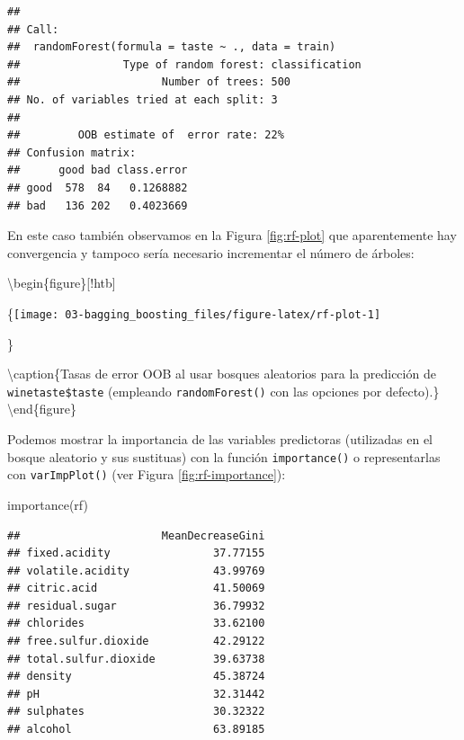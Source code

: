 \documentclass[
  spanish,
]{book}
\newenvironment{Shaded}{\begin{snugshade}}{\end{snugshade}}
\newcommand{\AttributeTok}[1]{\textcolor[rgb]{0.77,0.63,0.00}{#1}}
\newcommand{\DecValTok}[1]{\textcolor[rgb]{0.00,0.00,0.81}{#1}}
\newcommand{\FunctionTok}[1]{\textcolor[rgb]{0.00,0.00,0.00}{#1}}
\newcommand{\NormalTok}[1]{#1}
\newcommand{\SpecialCharTok}[1]{\textcolor[rgb]{0.00,0.00,0.00}{#1}}
\newcommand{\StringTok}[1]{\textcolor[rgb]{0.31,0.60,0.02}{#1}}
\theoremstyle{break}
\theoremstyle{definition}
\theoremstyle{definition}
\theoremstyle{definition}
\theoremstyle{definition}
\theoremstyle{remark}
\begin{document}
\begin{verbatim}
## 
## Call:
##  randomForest(formula = taste ~ ., data = train) 
##                Type of random forest: classification
##                      Number of trees: 500
## No. of variables tried at each split: 3
## 
##         OOB estimate of  error rate: 22%
## Confusion matrix:
##      good bad class.error
## good  578  84   0.1268882
## bad   136 202   0.4023669
\end{verbatim}

En este caso también observamos en la Figura \ref{fig:rf-plot} que aparentemente hay convergencia y tampoco sería necesario incrementar el número de árboles:

\begin{Shaded}
\end{Shaded}

\textbackslash begin\{figure\}{[}!htb{]}

\{\centering \texttt{[image: 03-bagging\_boosting\_files/figure-latex/rf-plot-1]}

\}

\textbackslash caption\{Tasas de error OOB al usar bosques aleatorios para la predicción de \texttt{winetaste\$taste} (empleando \texttt{randomForest()} con las opciones por defecto).\}\label{fig:rf-plot}
\textbackslash end\{figure\}

Podemos mostrar la importancia de las variables predictoras (utilizadas en el bosque aleatorio y sus sustituas) con la función \texttt{importance()} o representarlas con \texttt{varImpPlot()} (ver Figura \ref{fig:rf-importance}):

\begin{Shaded}
\begin{Highlighting}[]
\FunctionTok{importance}\NormalTok{(rf)}
\end{Highlighting}
\end{Shaded}

\begin{verbatim}
##                      MeanDecreaseGini
## fixed.acidity                37.77155
## volatile.acidity             43.99769
## citric.acid                  41.50069
## residual.sugar               36.79932
## chlorides                    33.62100
## free.sulfur.dioxide          42.29122
## total.sulfur.dioxide         39.63738
## density                      45.38724
## pH                           32.31442
## sulphates                    30.32322
## alcohol                      63.89185
\end{verbatim}
\end{document}

